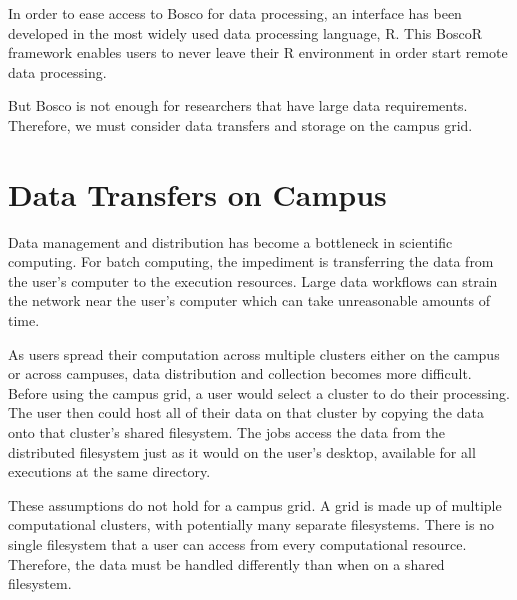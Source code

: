 In order to ease access to Bosco for data processing, an interface has been developed in the most widely used data processing language, R.  This BoscoR framework enables users to never leave their R environment in order start remote data processing.

But Bosco is not enough for researchers that have large data requirements.  Therefore, we must consider data transfers and storage on the campus grid.










\section{Data Transfers on Campus}

Data management and distribution has become a bottleneck in scientific computing.  For batch computing, the impediment is transferring the data from the user's computer to the execution resources.  Large data workflows can strain the network near the user's computer which can take unreasonable amounts of time.

As users spread their computation across multiple clusters either on the campus or across campuses, data distribution and collection becomes more difficult.  Before using the campus grid, a user would select a cluster to do their processing.  The user then could host all of their data on that cluster by copying the data onto that cluster's shared filesystem.  The jobs access the data from the distributed filesystem just as it would on the user's desktop, available for all executions at the same directory.

These assumptions do not hold for a campus grid.  A grid is made up of multiple computational clusters, with potentially many separate filesystems.  There is no single filesystem that a user can access from every computational resource.  Therefore, the data must be handled differently than when on a shared filesystem.  


